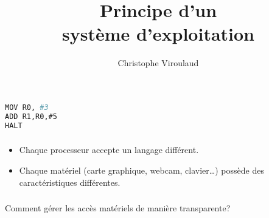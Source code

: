 \documentclass[svgnames,11pt]{beamer}
\author[]{Christophe Viroulaud}
\title{Principe d'un\\système d'exploitation}
\date{\framebox{\textbf{ArchMat 08}}}
\institute{Première - NSI}
\begin{document}
\begin{frame}
\titlepage
\end{frame}
\begin{frame}[fragile]
    \frametitle{}

    \begin{center}
        \begin{lstlisting}[language=Bash , basicstyle=\small, xleftmargin=2em, xrightmargin=2em]
MOV R0, #3
ADD R1,R0,#5
HALT
\end{lstlisting}
    \end{center}

\end{frame}
\begin{frame}
    \frametitle{}

    \begin{itemize}
        \item <1-> Chaque processeur accepte un langage différent.
        \item <2-> Chaque matériel (carte graphique, webcam, clavier\dots) possède des caractéristiques différentes.
    \end{itemize}

\end{frame}
\begin{frame}
    \frametitle{}

    \begin{framed}
        \centering Comment gérer les accès matériels de manière transparente?
    \end{framed}

\end{frame}
\end{document}
